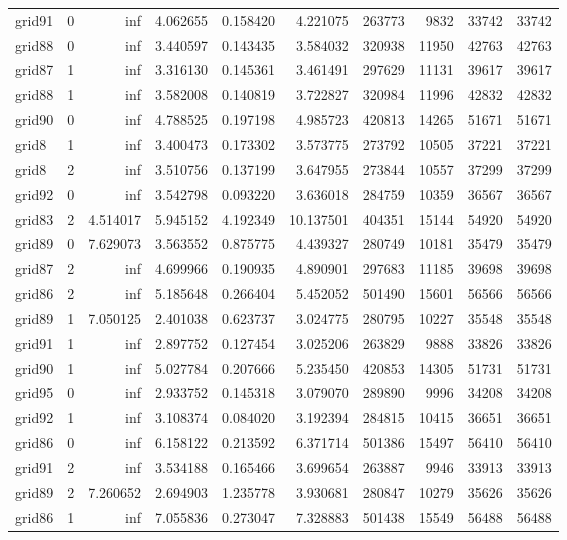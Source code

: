 \begin{longtable}{|l|r|r|r|r|r|r|r|r|r|}
grid91 & 0 & inf & 4.062655 & 0.158420 & 4.221075 & 263773 & 9832 & 33742 & 33742 \\
grid88 & 0 & inf & 3.440597 & 0.143435 & 3.584032 & 320938 & 11950 & 42763 & 42763 \\
grid87 & 1 & inf & 3.316130 & 0.145361 & 3.461491 & 297629 & 11131 & 39617 & 39617 \\
grid88 & 1 & inf & 3.582008 & 0.140819 & 3.722827 & 320984 & 11996 & 42832 & 42832 \\
grid90 & 0 & inf & 4.788525 & 0.197198 & 4.985723 & 420813 & 14265 & 51671 & 51671 \\
grid8 & 1 & inf & 3.400473 & 0.173302 & 3.573775 & 273792 & 10505 & 37221 & 37221 \\
grid8 & 2 & inf & 3.510756 & 0.137199 & 3.647955 & 273844 & 10557 & 37299 & 37299 \\
grid92 & 0 & inf & 3.542798 & 0.093220 & 3.636018 & 284759 & 10359 & 36567 & 36567 \\
grid83 & 2 & 4.514017 & 5.945152 & 4.192349 & 10.137501 & 404351 & 15144 & 54920 & 54920 \\
grid89 & 0 & 7.629073 & 3.563552 & 0.875775 & 4.439327 & 280749 & 10181 & 35479 & 35479 \\
grid87 & 2 & inf & 4.699966 & 0.190935 & 4.890901 & 297683 & 11185 & 39698 & 39698 \\
grid86 & 2 & inf & 5.185648 & 0.266404 & 5.452052 & 501490 & 15601 & 56566 & 56566 \\
grid89 & 1 & 7.050125 & 2.401038 & 0.623737 & 3.024775 & 280795 & 10227 & 35548 & 35548 \\
grid91 & 1 & inf & 2.897752 & 0.127454 & 3.025206 & 263829 & 9888 & 33826 & 33826 \\
grid90 & 1 & inf & 5.027784 & 0.207666 & 5.235450 & 420853 & 14305 & 51731 & 51731 \\
grid95 & 0 & inf & 2.933752 & 0.145318 & 3.079070 & 289890 & 9996 & 34208 & 34208 \\
grid92 & 1 & inf & 3.108374 & 0.084020 & 3.192394 & 284815 & 10415 & 36651 & 36651 \\
grid86 & 0 & inf & 6.158122 & 0.213592 & 6.371714 & 501386 & 15497 & 56410 & 56410 \\
grid91 & 2 & inf & 3.534188 & 0.165466 & 3.699654 & 263887 & 9946 & 33913 & 33913 \\
grid89 & 2 & 7.260652 & 2.694903 & 1.235778 & 3.930681 & 280847 & 10279 & 35626 & 35626 \\
grid86 & 1 & inf & 7.055836 & 0.273047 & 7.328883 & 501438 & 15549 & 56488 & 56488 \\

\end{longtable}
